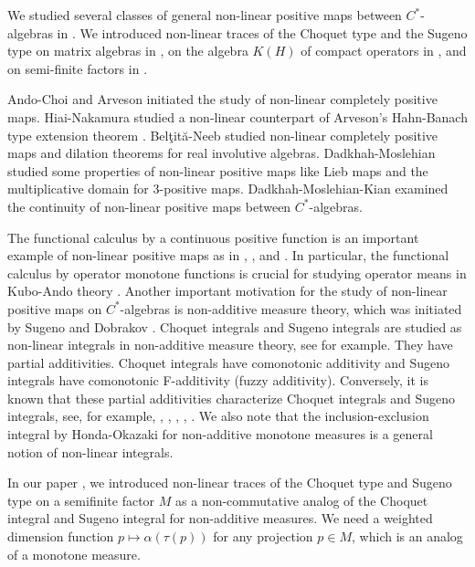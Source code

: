 \documentclass[a4paper,12pt]{amsart}
\begin{document}
We studied several classes of general non-linear positive maps between $C^*$-algebras 
in \cite{nagisawatatani}.  We introduced non-linear traces  
of the Choquet type and the Sugeno type on matrix algebras in \cite{nagisawatatani2}, on the algebra $K(H)$ of 
compact operators in \cite{nagisawatatani3}, and on semi-finite factors in \cite{nagisawatatani4}.   

Ando-Choi \cite{A-C} and Arveson \cite{Ar2} initiated the study of  non-linear completely 
positive maps.   
Hiai-Nakamura \cite{H-N} studied a non-linear counterpart of Arveson's 
Hahn-Banach type extension theorem \cite {Ar1}. 
Bel\c{t}it\u{a}-Neeb \cite{B-N} studied non-linear completely positive maps and dilation theorems for real involutive algebras.
Dadkhah-Moslehian \cite{D-M} studied some properties of non-linear positive maps 
like Lieb maps and the multiplicative domain for 3-positive maps. 
Dadkhah-Moslehian-Kian \cite{D-M-K} examined the continuity of non-linear positive maps between $C^*$-algebras. 


The functional calculus by a continuous positive function is an important example of non-linear positive maps as in  
\cite{bhatia1}, \cite{bhatia2}, and  \cite{H}. %
In particular, the functional calculus by operator monotone functions is crucial for studying operator means 
in Kubo-Ando theory \cite{kuboando}.  
Another important motivation for the study of non-linear positive maps on $C^*$-algebras is
non-additive measure theory, which was initiated by Sugeno \cite{Su} and  Dobrakov \cite{dobrakov}. 
Choquet integrals \cite{Ch} and Sugeno integrals \cite{Su} are studied as non-linear integrals in 
non-additive measure theory, see \cite{wang} for example.  
They have partial additivities. 
Choquet integrals have  comonotonic additivity and 
Sugeno integrals have comonotonic F-additivity (fuzzy additivity). Conversely,  it is known that 
these partial additivities characterize 
Choquet integrals and Sugeno integrals, see, for example, \cite{De}, 
\cite{schmeidler}, \cite{C-B}, \cite{C-M-R}, \cite{D-G}. 
We also note that the inclusion-exclusion integral by Honda-Okazaki \cite{H-O} for non-additive monotone measures is a general notion of non-linear integrals. 

In our paper \cite{nagisawatatani4}, we introduced non-linear traces of the Choquet type and Sugeno type on a semifinite factor $M$ as a non-commutative analog of the Choquet integral and Sugeno integral for non-additive measures. 
We need a weighted dimension function $p \mapsto \alpha(\tau(p))$ for any projection $p \in M$, which is an analog of 
a monotone measure.
\end{document}
